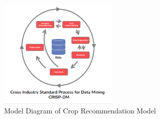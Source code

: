 \begin{figure}[h]
    \centering
    \includegraphics[width=0.5\textwidth]{Crisp Dm.png}
    \caption{Model Diagram of Crop Recommendation Model}
    \label{fig:my_label}
    
\end{figure}
